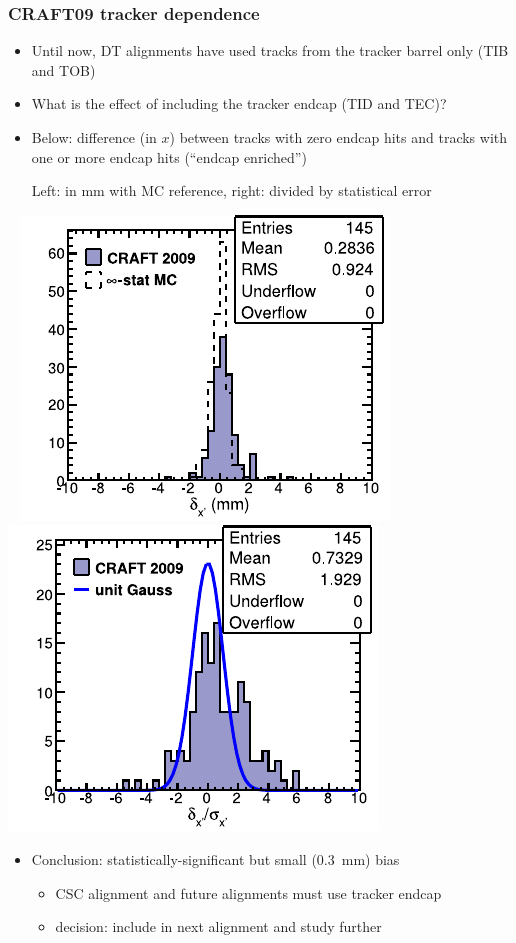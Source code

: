 \documentclass[compress]{beamer}
\begin{document}
\begin{frame}
\frametitle{CRAFT09 tracker dependence}
\begin{itemize}
\item Until now, DT alignments have used tracks from the tracker barrel only (TIB and TOB)
\item What is the effect of including the tracker endcap (TID and TEC)?
\item Below: difference (in $x$) between tracks with zero endcap hits and tracks with one or more endcap hits (``endcap enriched'')

Left: in mm with MC reference, right: divided by statistical error
\end{itemize}

\mbox{ } \hfill \includegraphics[width=0.4\linewidth]{tecdiff.pdf} \hfill \includegraphics[width=0.4\linewidth]{tecnorm.pdf} \hfill \mbox{ }

\begin{itemize}
\item Conclusion: statistically-significant but small (0.3~mm) bias
\begin{itemize}
\item CSC alignment and future alignments must use tracker endcap
\item decision: include in next alignment and study further
\end{itemize}
\end{itemize}
\end{frame}
\end{document}
